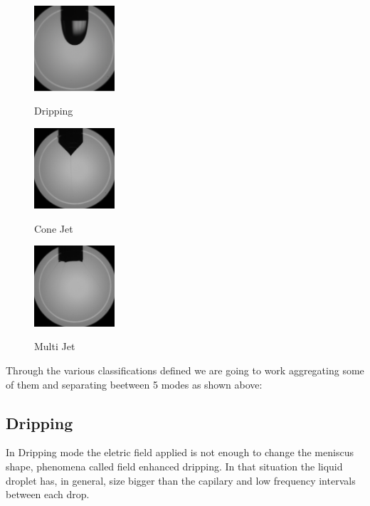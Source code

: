 \begin{multicols}{3}

  \begin{figure}[H]
      \center
      \includegraphics[width=3cm]{Figuras/drippingexample.png}
      \label{fig:dripping_camera_example}
      \caption{Dripping}
  \end{figure}


  \begin{figure}[H]
      \center
      \includegraphics[width=3cm]{Figuras/conejetexample.png}
      \label{fig:cone_camera_jet_example}
      \caption{Cone Jet}
  \end{figure}


  \begin{figure}[H]
      \center
      \includegraphics[width=3cm]{Figuras/multijetexample.png}
      \label{fig:multi_camera_jet_example}
      \caption{Multi Jet}
  \end{figure}

\end{multicols}

Through the various classifications defined we are going to work aggregating some of them and separating beetween 5 modes as shown above:

\subsection{Dripping}
\label{subsec:dripping}

In Dripping mode the eletric field applied is not enough to change the meniscus shape, phenomena called field enhanced dripping.
In that situation the liquid droplet has, in general, size bigger than the capilary and low frequency intervals between each drop.

